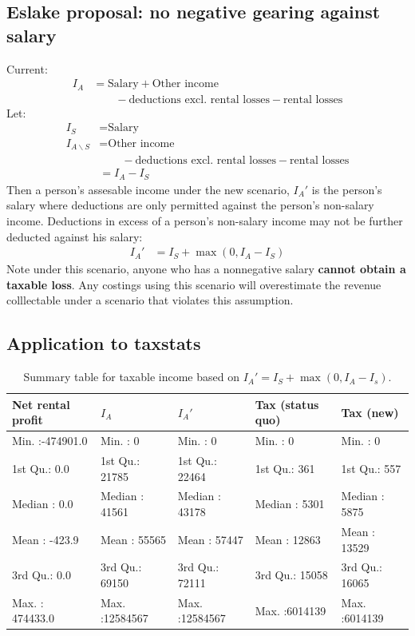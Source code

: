 \documentclass{grattan}\usepackage[]{graphicx}\usepackage[]{color}
\newcommand{\EMPH}[1]{\textbf{#1}}
\begin{document}
\subsection{Eslake proposal: no negative gearing against salary}
Current:
\begin{align*}
I_A &= \text{Salary} + \text{Other income} \\
&\qquad{} - \text{deductions excl. rental losses} - \text{rental losses}
\end{align*}
Let:
\begin{align*}
I_S &= \text{Salary}\\
I_{A\backslash S} &= \text{Other income} \\
&\qquad{} - \text{deductions excl. rental losses} - \text{rental losses} \\
 &= I_A - I_S
\end{align*}
Then a person's assesable income under the new scenario, $I_A'$ is the person's salary where deductions are only permitted against the person's non-salary income. Deductions in excess of a person's non-salary income may not be further deducted against his salary:
\begin{align*}
I_A' &= I_S + \max\left(0, I_A - I_S \right)
\end{align*}
Note under this scenario, anyone who has a nonnegative salary \EMPH{cannot obtain a taxable loss}. Any costings using this scenario will overestimate the revenue colllectable under a scenario that violates this assumption.

\subsection{Application to taxstats}
\begin{table}[ht]
\centering
\caption{Summary table for taxable income based on $I_A' = I_S + \max(0, I_A - I_s)$.} 
\begin{tabular}{lllll}
  \hline
Net rental profit &     $I_A$ &     $I_A'$ & Tax (status quo) &   Tax (new) \\ 
  \hline
Min.   :-474901.0   & Min.   :       0   & Min.   :       0   & Min.   :      0   & Min.   :      0   \\ 
  1st Qu.:      0.0   & 1st Qu.:   21785   & 1st Qu.:   22464   & 1st Qu.:    361   & 1st Qu.:    557   \\ 
  Median :      0.0   & Median :   41561   & Median :   43178   & Median :   5301   & Median :   5875   \\ 
  Mean   :   -423.9   & Mean   :   55565   & Mean   :   57447   & Mean   :  12863   & Mean   :  13529   \\ 
  3rd Qu.:      0.0   & 3rd Qu.:   69150   & 3rd Qu.:   72111   & 3rd Qu.:  15058   & 3rd Qu.:  16065   \\ 
  Max.   : 474433.0   & Max.   :12584567   & Max.   :12584567   & Max.   :6014139   & Max.   :6014139   \\ 
   \hline
\end{tabular}
\end{table}
\end{document}
